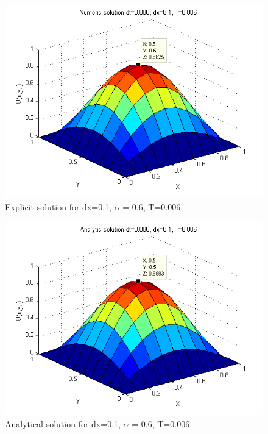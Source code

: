 \documentclass[a4paper,10pt]{article}
\begin{document}
{\begin{figure}
\end{figure}

\begin{figure}
  \begin{center}
    \includegraphics[scale=0.5]{num_dt0006_dx01_T0006}
    \caption{Explicit solution for dx=0.1, $\alpha$ = 0.6, T=0.006}
    \label{fig:Num_feil1}
  \end{center}

\end{figure}

\begin{figure}
  \begin{center}
    \includegraphics[scale=0.5]{ana_dt0006_dx01_T0006}
    \caption{Analytical solution for dx=0.1, $\alpha$ = 0.6, T=0.006}
    \label{fig:Ana_feil1}
  \end{center}


\end{figure}}
\end{document}
